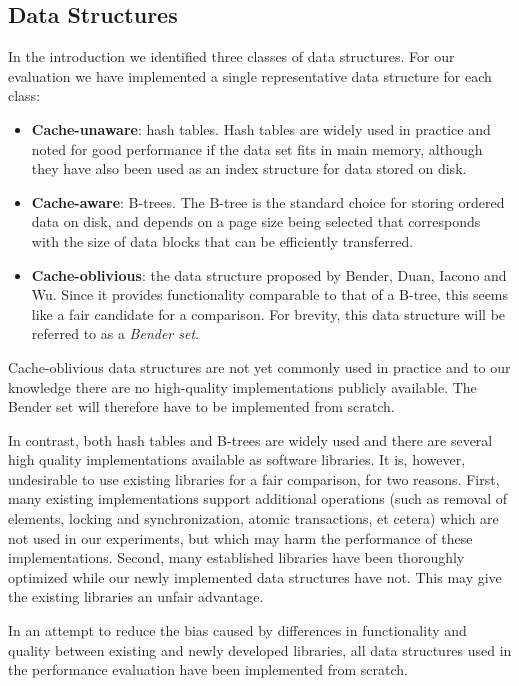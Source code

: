 \documentclass{acm_proc_article-sp}
\begin{document}
\subsection{Data Structures}
In the introduction we identified three classes of data structures.
For our evaluation we have implemented a single representative data structure
for each class:
\begin{itemize}
\item \textbf{Cache-unaware}: hash tables. Hash tables are widely used in practice and noted for good performance if the data set fits in main memory, although they have also been used as an index structure for data stored on disk.
\item \textbf{Cache-aware}: B-trees. The B-tree is the standard choice for storing ordered data on disk, and depends on a page size being selected that corresponds with the size of data blocks that can be efficiently transferred.
\item \textbf{Cache-oblivious}: the data structure proposed by Bender, Duan, Iacono and Wu. Since it provides functionality comparable to that of a B-tree, this seems like a fair candidate for a comparison. For brevity, this data structure will be referred to as a \emph{Bender set}.
\end{itemize}

Cache-oblivious data structures are not yet commonly used in practice and to
our knowledge there are no high-quality implementations publicly available.
The Bender set will therefore have to be implemented from scratch.

In contrast, both hash tables and B-trees are widely used and there are several
high quality implementations available as software libraries. It is, however,
undesirable to use existing libraries for a fair comparison, for two reasons. First, many existing implementations support additional operations (such as removal of elements, locking and synchronization, atomic transactions, et cetera) which are not used in our experiments, but which may harm the performance of these implementations. Second, many established libraries have been thoroughly optimized while our newly implemented data structures have not. This may give the existing libraries an unfair advantage.

In an attempt to reduce the bias caused by differences in functionality and
quality between existing and newly developed libraries, all data structures
used in the performance evaluation have been implemented from scratch.
\end{document}
